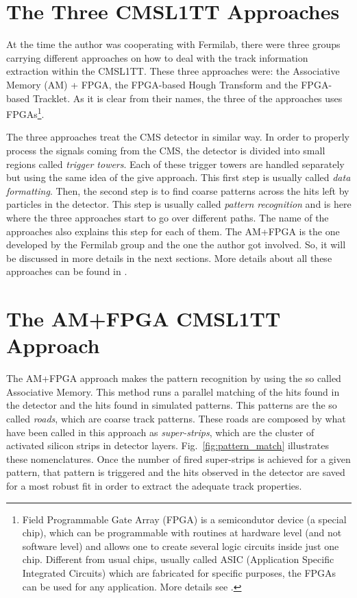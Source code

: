 \section{The Three CMSL1TT Approaches}
At the time the author was cooperating with Fermilab, there were three groups carrying different approaches on how to deal with the track information extraction within the CMSL1TT. These three approaches were: the Associative Memory (AM) + FPGA, the FPGA-based Hough Transform and the FPGA-based Tracklet. As it is clear from their names, the three of the approaches uses FPGAs\footnote{Field Programmable Gate Array (FPGA) is a semicondutor device (a special chip), which can be programmable with routines at hardware level (and not software level) and allows one to create several logic circuits inside just one chip. Different from usual chips, usually called ASIC (Application Specific Integrated Circuits) which are fabricated for specific purposes, the FPGAs can be used for any application. More details see \cite{bib:fpga_xilinx}.}.

The three approaches treat the CMS detector in similar way. In order to properly process the signals coming from the CMS, the detector is divided into small regions called \textit{trigger towers}. Each of these trigger towers are handled separately but using the same idea of the give approach. This first step is usually called \textit{data formatting}. Then, the second step is to find coarse patterns across the hits left by particles in the detector. This step is usually called \textit{pattern recognition} and is here where the three approaches start to go over different paths. The name of the approaches also explains this step for each of them. The AM+FPGA is the one developed by the Fermilab group and the one the author got involved. So, it will be discussed in more details in the next sections. More details about all these approaches can be found in \cite{bib:CMS-TDR-17-001}.


\section{The AM+FPGA CMSL1TT Approach}
The AM+FPGA approach makes the pattern recognition by using the so called Associative Memory. This method runs a parallel matching of the hits found in the detector and the hits found in simulated patterns. This patterns are the so called \textit{roads}, which are coarse track patterns. These roads are composed by what have been called in this approach as \textit{super-strips}, which are the cluster of activated silicon strips in detector layers. Fig.~\ref{fig:pattern_match} illustrates these nomenclatures. Once the number of fired super-strips is achieved for a given pattern, that pattern is triggered and the hits observed in the detector are saved for a most robust fit in order to extract the adequate track properties.

